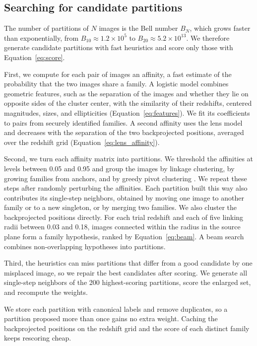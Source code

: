 \documentclass[twocolumn,twocolappendix,linenumbers]{aastex701}
\begin{document}
\subsection{Searching for candidate partitions}
\label{sec:search}
The number of partitions of $N$ images is the Bell number $B_N$, which grows faster than exponentially, from $B_{10}\approx1.2\times10^5$ to $B_{20}\approx5.2\times10^{13}$.
We therefore generate candidate partitions with fast heuristics and score only those with Equation~\ref{eq:score}.

First, we compute for each pair of images an affinity, a fast estimate of the probability that the two images share a family.
A logistic model combines geometric features, such as the separation of the images and whether they lie on opposite sides of the cluster center, with the similarity of their redshifts, centered magnitudes, sizes, and ellipticities (Equation~\ref{eq:features}).
We fit its coefficients to pairs from securely identified families.
A second affinity uses the lens model and decreases with the separation of the two backprojected positions, averaged over the redshift grid (Equation~\ref{eq:lens_affinity}).

Second, we turn each affinity matrix into partitions.
We threshold the affinities at levels between 0.05 and 0.95 and group the images by linkage clustering, by growing families from anchors, and by greedy pivot clustering \citep{Ailon2008}.
We repeat these steps after randomly perturbing the affinities.
Each partition built this way also contributes its single-step neighbors, obtained by moving one image to another family or to a new singleton, or by merging two families.
We also cluster the backprojected positions directly.
For each trial redshift and each of five linking radii between 0.03 and 0.18\arcsec, images connected within the radius in the source plane form a family hypothesis, ranked by Equation~\ref{eq:beam}.
A beam search combines non-overlapping hypotheses into partitions.

Third, the heuristics can miss partitions that differ from a good candidate by one misplaced image, so we repair the best candidates after scoring.
We generate all single-step neighbors of the 200 highest-scoring partitions, score the enlarged set, and recompute the weights.

We store each partition with canonical labels and remove duplicates, so a partition proposed more than once gains no extra weight.
Caching the backprojected positions on the redshift grid and the score of each distinct family keeps rescoring cheap.
\end{document}

